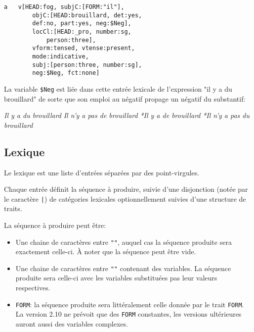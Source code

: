 \documentclass[11pt]{article}
\begin{document}
\begin{itemize}
\begin{lstlisting}[numbers=none]
a	v[HEAD:fog, subjC:[FORM:"il"], 
		objC:[HEAD:brouillard, det:yes, 
		def:no, part:yes, neg:$Neg], 
		locCl:[HEAD:_pro, number:sg, 
			person:three], 
		vform:tensed, vtense:present, 
		mode:indicative, 
		subj:[person:three, number:sg], 
		neg:$Neg, fct:none]
\end{lstlisting}

La variable \verb#$Neg# est liée dans cette entrée lexicale de l'expression "il y
a du brouillard" de sorte que son emploi au négatif propage un négatif
du substantif:

\begin{exe}
\ex \begin{xlist} 
\ex \label{0-a} \textit{Il y a du brouillard}
\ex \label{0-a}  \textit{Il n'y a pas de brouillard}
\ex \label{0-a} \textit{*Il y a de brouillard}
\ex \label{0-a} \textit{*Il n'y a pas du brouillard}
\end{xlist}
\end{exe}

\end{itemize}



\subsection{Lexique}

Le lexique est une liste d'entrées séparées par des point-virgules.

Chaque entrée définit la séquence à produire, suivie d'une disjonction
(notée par le caractère \verb#|#) de catégories lexicales
optionnellement suivies d'une structure de traits.

La séquence à produire peut être:

\begin{itemize}
\item Une chaine de caractères entre \verb#""#, auquel cas la séquence
  produite sera exactement celle-ci. À noter que la séquence peut être vide.

\item Une chaine de caractères entre \verb#""# contenant des
  variables. La séquence produite sera celle-ci avec les variables
  substituées pas leur valeurs respectives.

\item \texttt{FORM}: la séquence produite sera littéralement celle
  donnée par le trait \texttt{FORM}. La version 2.10 ne prévoit que
  des \texttt{FORM} constantes, les versions ultérieures auront aussi
  des variables complexes.

\end{itemize}
\end{document}
